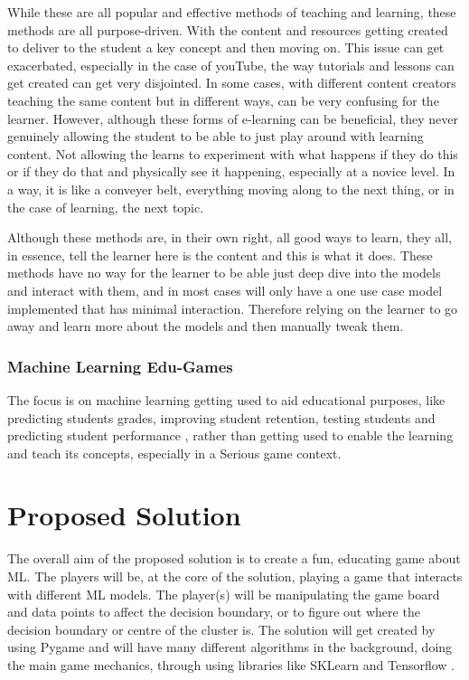 		While these are all popular and effective methods of teaching and learning, these methods are all purpose-driven. With the content and resources getting created to deliver to the student a key concept and then moving on. This issue can get exacerbated, especially in the case of youTube, the way tutorials and lessons can get created can get very disjointed. In some cases, with different content creators teaching the same content but in different ways, can be very confusing for the learner. However, although these forms of e-learning can be beneficial, they never genuinely allowing the student to be able to just play around with learning content. Not allowing the learns to experiment with what happens if they do this or if they do that and physically see it happening, especially at a novice level. In a way, it is like a conveyer belt, everything moving along to the next thing, or in the case of learning, the next topic.
		
		Although these methods are, in their own right, all good ways to learn, they all, in essence, tell the learner here is the content and this is what it does. These methods have no way for the learner to be able just deep dive into the models and interact with them, and in most cases will only have a one use case model implemented that has minimal interaction. Therefore relying on the learner to go away and learn more about the models and then manually tweak them.
		
	
	\subsubsection{Machine Learning Edu-Games}
		\label{sub_sec:ml_edu_games}
		
		The focus is on machine learning getting used to aid educational purposes, like predicting students grades, improving student retention, testing students and predicting student performance \cite{kuvcak2018machine}, rather than getting used to enable the learning and teach its concepts, especially in a Serious game context.
	
	\section{Proposed Solution}
	The overall aim of the proposed solution is to create a fun, educating game about ML. The players will be, at the core of the solution, playing a game that interacts with different ML models. The player(s) will be manipulating the game board and data points to affect the decision boundary, or to figure out where the decision boundary or centre of the cluster is. The solution will get created by using  Pygame and will have many different algorithms in the background, doing the main game mechanics, through using libraries like SKLearn \cite{sklearn_api} and Tensorflow \cite{tensorflow2015-whitepaper}.
	
